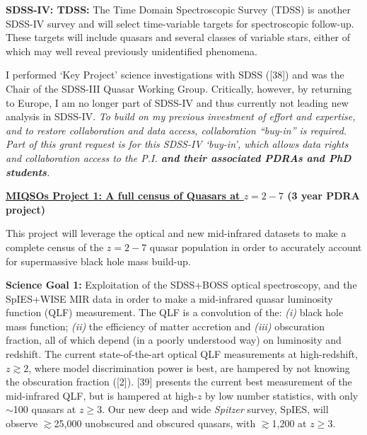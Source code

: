 \documentclass[oneside, a4paper, onecolumn, 11pt]{article}
\begin{document}
\smallskip
\smallskip

{\bf SDSS-IV: TDSS:}  
The Time Domain Spectroscopic Survey (TDSS) is another SDSS-IV survey
and will select time-variable targets for spectroscopic
follow-up. These targets will include quasars and several classes of
variable stars, either of which may well reveal previously
unidentified phenomena. 


\smallskip
\smallskip
\noindent
I performed `Key Project' science investigations with SDSS
([38]) and was the Chair of the SDSS-III Quasar Working
Group. Critically, however, by returning to Europe, I am no longer
part of SDSS-IV and thus currently not leading new analysis in
SDSS-IV. {\it To build on my previous investment of effort and expertise,
and to restore collaboration and data access, collaboration
``buy-in'' is required. 
Part of this grant request is for this SDSS-IV `buy-in', which allows
data rights and collaboration access to the P.I. \textbf{and their associated PDRAs
and PhD students}.}

   
\medskip
\medskip
\medskip
\smallskip
\smallskip
\noindent
{\bf  \underline{\large MIQSOs Project 1: A full census of Quasars at $z=2-7$} (3 year PDRA project)}

\smallskip
\noindent
This project will leverage the optical and new  mid-infrared datasets to make 
a complete census of the $z=2-7$ quasar population in order to accurately 
account for supermassive black hole mass build-up. 

\smallskip
\smallskip
\noindent
{\bf Science Goal 1:}
Exploitation of the SDSS+BOSS optical spectroscopy, and the SpIES+WISE
MIR data in order to make a mid-infrared quasar luminosity function
(QLF) measurement. The QLF is a convolution of the: {\it (i)} black
hole mass function; {\it (ii)} the efficiency of matter accretion and
{\it (iii)} obscuration fraction, all of which depend (in a poorly
understood way) on luminosity and redshift. The current
state-of-the-art optical QLF measurements at high-redshift,
$z\gtrsim2$, where model discrimination power is best, are hampered
by not knowing the obscuration fraction ([2]). [39] presents the
current best measurement of the mid-infrared QLF, but is hampered at
high-$z$ by low number statistics, with only $\sim$100 quasars at
$z\geq3$. Our new deep and wide {\it Spitzer} survey, SpIES, will observe
$\gtrsim$25,000 unobscured and obscured quasars, with  $\gtrsim$1,200 at
$z\geq3$.
\end{document}
